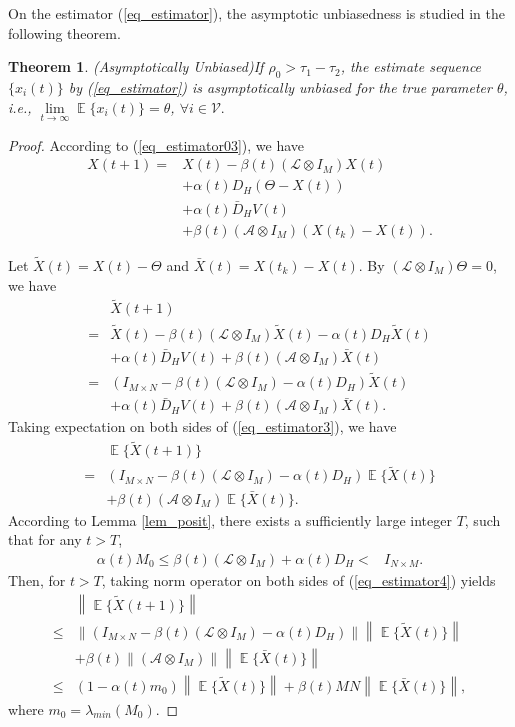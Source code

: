 \documentclass[10pt,journal,final]{IEEEtran}
\DeclareMathOperator{\Expect}{\mathbb{E}}
\newcommand{\norm}[1]{\left\lVert#1\right\rVert}
\theoremstyle{plain}
\newtheorem{theorem}{Theorem}[section]
\theoremstyle{definition}
\theoremstyle{remark}
\begin{document}
On the estimator (\ref{eq_estimator}), the asymptotic unbiasedness is studied in the following theorem.
\begin{theorem}(Asymptotically Unbiased)\label{thm_bias}
If $\rho_0>\tau_1-\tau_2$, the estimate sequence $\{x_{i}(t)\}$ by (\ref{eq_estimator}) is asymptotically unbiased for the true parameter $\theta$, i.e., $\lim\limits_{t\rightarrow\infty}\Expect\{x_{i}(t)\}=\theta$, $\forall i\in\mathcal{V}.$
\end{theorem}
\begin{proof}
According to (\ref{eq_estimator03}), we have
\begin{align}\label{eq_estimator2}
X(t+1)=&X(t)-\beta(t)(\mathcal{L}\otimes I_M)X(t)\nonumber\\
&+\alpha(t) D_H(\Theta-X(t))\nonumber\\
&+\alpha(t)\bar D_HV(t)\\
&+\beta(t)(\mathcal{A}\otimes I_M)(X(t_{k})-X(t))\nonumber.
\end{align}
	
	
Let $\tilde X(t)=X(t)-\Theta$ and $\bar X(t)=X(t_{k})-X(t)$. By $(\mathcal{L}\otimes I_M)\Theta=0$, we have
\begin{align}\label{eq_estimator3}
&\tilde X(t+1)\nonumber\\
=&\tilde X(t)-\beta(t)(\mathcal{L}\otimes I_M)\tilde X(t)-\alpha(t) D_H\tilde X(t)\nonumber\\
&+\alpha(t)\bar D_HV(t)+\beta(t)(\mathcal{A}\otimes I_M)\bar X(t)\\
=&\left(I_{M\times N}-\beta(t)(\mathcal{L}\otimes I_M)-\alpha(t) D_H\right)\tilde X(t)\nonumber\\
&+\alpha(t)\bar D_HV(t)+\beta(t)(\mathcal{A}\otimes I_M)\bar X(t).\nonumber
\end{align}
Taking expectation on both sides of (\ref{eq_estimator3}), we have
\begin{align}\label{eq_estimator4}
&\Expect\{\tilde X(t+1)\}\nonumber\\
=&\left(I_{M\times N}-\beta(t)(\mathcal{L}\otimes I_M)-\alpha(t) D_H\right)\Expect\{\tilde X(t)\}\nonumber\\
&+\beta(t)(\mathcal{A}\otimes I_M)\Expect\{\bar X(t)\}.
\end{align}
According to Lemma \ref{lem_posit}, there exists a  sufficiently large integer $T$, such that for any $t>T$,
	\begin{align*}
\alpha(t) M_0\leq \beta(t)(\mathcal{L}\otimes I_M)+\alpha(t) D_H
< & I_{N\times M}.
\end{align*}
Then, for $t>T$, taking norm operator on both sides of (\ref{eq_estimator4}) yields 
\begin{align}\label{eq_estimator5}
&\norm{\Expect\{\tilde X(t+1)\}}\nonumber\\
\leq&\norm{\left(I_{M\times N}-\beta(t)(\mathcal{L}\otimes I_M)-\alpha(t)  D_H\right)}\norm{\Expect\{\tilde X(t)\}}\nonumber\\
&+\beta(t)\norm{(\mathcal{A}\otimes I_M)}\norm{\Expect\{\bar X(t)\}}\\
\leq& (1-\alpha(t)m_0)\norm{\Expect\{\tilde X(t)\}}+\beta(t)MN\norm{\Expect\{\bar X(t)\}}\nonumber,
\end{align}
where $m_0=\lambda_{min}(M_0)$.


\end{proof}
\end{document}
